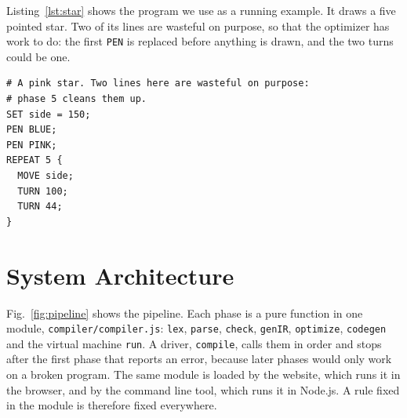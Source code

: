 \documentclass[conference]{IEEEtran}
\newcommand{\code}[1]{\texttt{#1}}
\begin{document}
Listing~\ref{lst:star} shows the program we use as a running example. It draws a five pointed star. Two of its lines are wasteful on purpose, so that the optimizer has work to do: the first \code{PEN} is replaced before anything is drawn, and the two turns could be one.

\begin{lstlisting}[style=turtle, caption={The Star, our running example}, label={lst:star}, float=t]
# A pink star. Two lines here are wasteful on purpose:
# phase 5 cleans them up.
SET side = 150;
PEN BLUE;
PEN PINK;
REPEAT 5 {
  MOVE side;
  TURN 100;
  TURN 44;
}
\end{lstlisting}

\section{System Architecture}

Fig.~\ref{fig:pipeline} shows the pipeline. Each phase is a pure function in one module, \code{compiler/compiler.js}: \code{lex}, \code{parse}, \code{check}, \code{genIR}, \code{optimize}, \code{codegen} and the virtual machine \code{run}. A driver, \code{compile}, calls them in order and stops after the first phase that reports an error, because later phases would only work on a broken program. The same module is loaded by the website, which runs it in the browser, and by the command line tool, which runs it in Node.js. A rule fixed in the module is therefore fixed everywhere.
\end{document}
